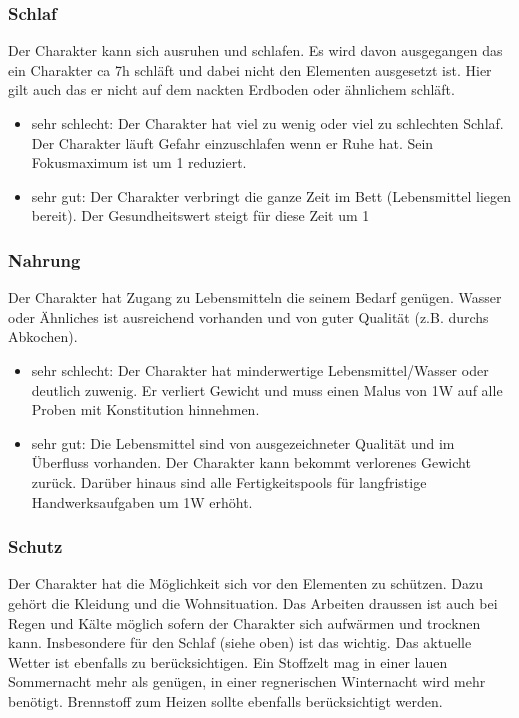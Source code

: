 \documentclass{article}
\begin{document}
\subsubsection{Schlaf}

Der Charakter kann sich ausruhen und schlafen. Es wird davon ausgegangen das ein Charakter ca 7h schläft und dabei
nicht den Elementen ausgesetzt ist. Hier gilt auch das er nicht auf dem nackten Erdboden oder ähnlichem schläft.

\begin{itemize}
\item sehr schlecht: Der Charakter hat viel zu wenig oder viel zu schlechten Schlaf. Der Charakter läuft Gefahr einzuschlafen wenn er Ruhe hat. Sein Fokusmaximum ist um 1 reduziert.
\item sehr gut: Der Charakter verbringt die ganze Zeit im Bett (Lebensmittel liegen bereit). Der Gesundheitswert steigt für diese Zeit um 1
\end{itemize}

\subsubsection{Nahrung}

Der Charakter hat Zugang zu Lebensmitteln die seinem Bedarf genügen. Wasser oder Ähnliches ist ausreichend vorhanden
und von guter Qualität (z.B. durchs Abkochen).

\begin{itemize}
\item sehr schlecht: Der Charakter hat minderwertige Lebensmittel/Wasser oder deutlich zuwenig. Er verliert Gewicht und muss einen Malus von 1W auf alle Proben mit Konstitution hinnehmen.
\item sehr gut: Die Lebensmittel sind von ausgezeichneter Qualität und im Überfluss vorhanden. Der Charakter kann bekommt verlorenes Gewicht zurück. Darüber hinaus sind alle Fertigkeitspools für langfristige Handwerksaufgaben um 1W erhöht.
\end{itemize}

\subsubsection{Schutz}

Der Charakter hat die Möglichkeit sich vor den Elementen zu schützen. Dazu gehört die Kleidung und die Wohnsituation.
Das Arbeiten draussen ist auch bei Regen und Kälte möglich sofern der Charakter sich aufwärmen und trocknen kann.
Insbesondere für den Schlaf (siehe oben) ist das wichtig. Das aktuelle Wetter ist ebenfalls zu berücksichtigen. Ein
Stoffzelt mag in einer lauen Sommernacht mehr als genügen, in einer regnerischen Winternacht wird mehr benötigt.
Brennstoff zum Heizen sollte ebenfalls berücksichtigt werden.
\end{document}
